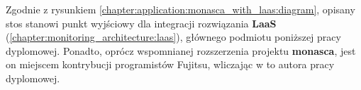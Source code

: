Zgodnie z rysunkiem \ref{chapter:application:monasca_with_laas:diagram}, opisany stos stanowi punkt wyjściowy dla integracji 
rozwiązania \textbf{LaaS} (\ref{chapter:monitoring_architecture:laas}), głównego podmiotu poniższej pracy dyplomowej. 
Ponadto, oprócz wspomnianej rozszerzenia projektu \textbf{monasca}, jest on miejscem kontrybucji programistów Fujitsu, 
wliczając w to autora pracy dyplomowej.


\clearpage 



